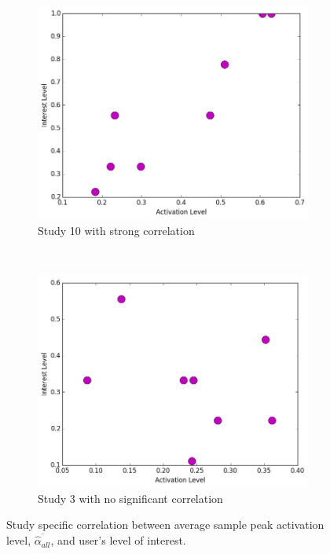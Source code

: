 \begin{figure}[!htb]
	\centering
	\begin{subfigure}[t]{0.45\textwidth}
		\centering
		\includegraphics[width=1.0 \textwidth]{"fig/validations/study_10 - correlation total activation"}
		\caption[Study 10]{Study 10 with strong correlation}
		\label{fig:correlation-study10}
	\end{subfigure}
	~ 
	\begin{subfigure}[t]{0.45\textwidth}
		\centering
		\includegraphics[width=1.0 \textwidth]{"fig/validations/study_3 - correlation total activation"}
		\caption[Study 3]{Study 3 with no significant correlation}
		\label{fig:correlation-study3}
	\end{subfigure}
	\caption[Study specific correlation between activation level and user's level of interest]{Study specific correlation between average sample peak activation level, $\overline{\widehat{\alpha}_{all}}$, and user's level of interest.}
	\label{fig:correlation-study-specific}
\end{figure}


